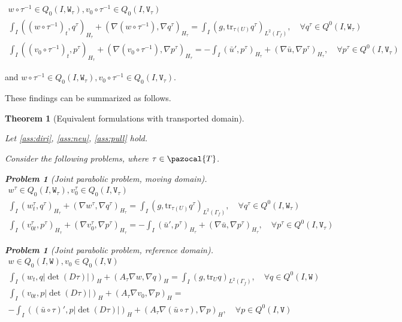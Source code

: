 \documentclass[english,a4paper,9pt,oneside]{scrbook}	%
\theoremstyle{break}
\newtheorem{thm}[equation]{Theorem}
\newtheorem{pb}[equation]{Problem}
\theoremstyle{remark}
\newcommand{\tr}{\text{tr}}
\newcommand{\cT}{\pazocal{T}}
\newcommand{\tw}[1]{\texttt{#1}}
\begin{document}
\begin{appendices}
\begin{align*}
w\circ \tau^{-1} \in Q_0(I, \tw{W}_\tau), v_0\circ \tau^{-1} \in Q_0(I,\tw{V}_\tau) \\
\int_I ((w\circ \tau^{-1})_t , q^\tau)_{H_\tau}+ (\nabla (w\circ \tau^{-1}), \nabla q^\tau)_{H_\tau} = \int_I(g,\tr_{\tau(U)} q^\tau)_{L^2(\Gamma_f)}, \quad \forall q^\tau \in Q^0(I, \tw{W}_\tau) \\
\int_I ((v_0\circ \tau^{-1})_t,p^\tau)_{H_\tau} + (\nabla (v_0\circ \tau^{-1}), \nabla p^\tau)_{H_\tau}= -\int_I(\bar{u}',p^\tau)_{H_\tau}+(\nabla \bar{u}, \nabla p^\tau)_{H_\tau}, \quad \forall p^\tau \in Q^0(I, \tw{V}_\tau)
\end{align*}

and $w\circ \tau^{-1} \in Q_0(I, \tw{W}_\tau), v_0\circ \tau^{-1} \in Q_0(I,\tw{V}_\tau)$.

These findings can be summarized as follows.

\begin{thm}[Equivalent formulations with transported domain]
\label{thm:eq_pde}

Let \cref{ass:diri}, \cref{ass:neu}, \cref{ass:pull} hold.

Consider the following problems, where $\tau \in \cT$.

\begin{pb}[Joint parabolic problem, moving domain]
\label{pb:joint_mov}
\begin{align*}
w^\tau \in Q_0(I, \tw{W}_\tau), v_0^\tau \in Q_0(I,\tw{V}_\tau) \\
\int_I  (w^\tau_t , q^\tau)_{H_\tau}+ (\nabla w^\tau, \nabla q^\tau)_{H_\tau} = \int_I(g,\tr_{\tau(U)} q^\tau)_{L^2(\Gamma_f)}, \quad \forall q^\tau \in Q^0(I, \tw{W}_\tau) \\
\int_I (v^\tau_{0t},p^\tau)_{H_\tau} + (\nabla v_0^\tau, \nabla p^\tau)_{H_\tau}= -\int_I(\bar{u}',p^\tau)_{H_\tau}+(\nabla \bar{u}, \nabla p^\tau)_{H_\tau}, \quad \forall p^\tau \in Q^0(I, \tw{V}_\tau)
\end{align*}
\end{pb}

\begin{pb}[Joint parabolic problem, reference domain]
\label{pb:joint_ref}
\begin{align*}
w \in Q_0(I, \tw{W}), v_0 \in Q_0(I,\tw{V}) \\
\int_I ( w_t , q |\det(D\tau)|)_H+ (A_\tau\nabla w, \nabla q)_{H} =\int_I(g,\tr_{U} q)_{L^2(\Gamma_f)}, \quad \forall q \in Q^0(I, \tw{W}) \\
\int_I ( v_{0t},p |\det(D\tau)|)_H + (A_\tau \nabla v_0, \nabla p)_{H}=\\ -\int_I((\bar{u}\circ \tau)',p|\det(D\tau)|)_{H}+(A_\tau \nabla (\bar{u} \circ \tau), \nabla p)_{H}, \quad \forall p \in Q^0(I, \tw{V})
\end{align*}
\end{pb}


\end{thm}
\end{appendices}
\end{document}

